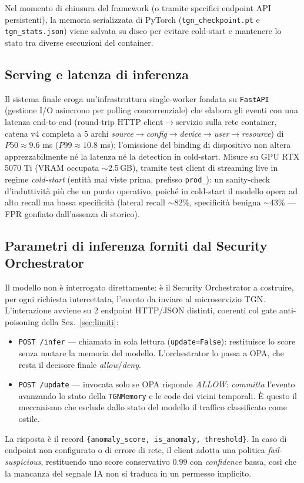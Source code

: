 Nel momento di chiusura del framework (o tramite specifici endpoint API persistenti), la memoria serializzata di PyTorch (\texttt{tgn\_checkpoint.pt} e \texttt{tgn\_stats.json}) viene salvata su disco per evitare cold-start e mantenere lo stato tra diverse esecuzioni del container.

\subsection{Serving e latenza di inferenza}

Il sistema finale eroga un'infrastruttura single-worker fondata su \texttt{FastAPI} (gestione I/O asincrono per polling concorrenziale) che elabora gli eventi con una latenza end-to-end (round-trip HTTP client$\to$servizio sulla rete container, catena v4 completa a 5 archi \textit{source}$\to$\textit{config}$\to$\textit{device}$\to$\textit{user}$\to$\textit{resource}) di $P50 \approx 9.6$ ms ($P99 \approx 10.8$ ms); l'omissione del binding di dispositivo non altera apprezzabilmente né la latenza né la detection in cold-start. Misure su GPU RTX 5070 Ti (VRAM occupata $\sim$2.5\,GB), tramite test client di streaming live in regime \textit{cold-start} (entità mai viste prima, prefisso \texttt{prod\_}): un sanity-check d'induttività più che un punto operativo, poiché in cold-start il modello opera ad alto recall ma bassa specificità (lateral recall $\sim$82\%, specificità benigna $\sim$43\% --- FPR gonfiato dall'assenza di storico). 

\subsection{Parametri di inferenza forniti dal Security Orchestrator}
\label{sec:apiparams}

Il modello non è interrogato direttamente: è il Security Orchestrator a costruire, per ogni richiesta intercettata, l'evento da inviare al microservizio TGN. L'interazione avviene su 2 endpoint HTTP/JSON distinti, coerenti col gate anti-poisoning della Sez.~\ref{sec:limiti}:
\begin{itemize}
    \item \texttt{POST /infer} --- chiamata in sola lettura (\texttt{update=False}): restituisce lo score senza mutare la memoria del modello. L'orchestrator lo passa a OPA, che resta il decisore finale \textit{allow}/\textit{deny}.
    \item \texttt{POST /update} --- invocata solo se OPA risponde \textit{ALLOW}: \textit{committa} l'evento avanzando lo stato della \texttt{TGNMemory} e le code dei vicini temporali. È questo il meccanismo che esclude dallo stato del modello il traffico classificato come ostile.
\end{itemize}
La risposta è il record \texttt{\{anomaly\_score, is\_anomaly, threshold\}}. In caso di endpoint non configurato o di errore di rete, il client adotta una politica \emph{fail-suspicious}, restituendo uno score conservativo $0.99$ con \textit{confidence} bassa, così che la mancanza del segnale IA non si traduca in un permesso implicito.

